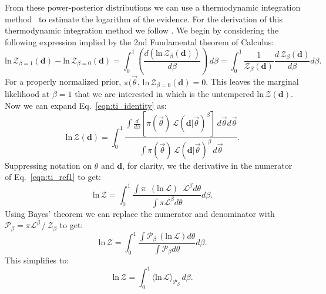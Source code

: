From these power-posterior distributions we can use a thermodynamic integration method~\citep{lartillot2006computing,friel2008marginal} to estimate the logarithm of the evidence. For the derivation of this thermodynamic integration method we follow \citep{annis2019thermodynamic}.
We begin by considering the following expression implied by the 2nd Fundamental theorem of Calculus:
\begin{equation}\label{eqn:ti_identity}
    \mathrm{ln} \, \mathcal{Z}_{\beta=1}\left(\mathbf{d}\right) - \mathrm{ln} \, \mathcal{Z}_{\beta=0}\left(\mathbf{d}\right) = \int^1_0 \left(\frac{d\left(\mathrm{ln} \, \mathcal{Z}_\beta \left(\mathbf{d}\right) \right)}{d\beta}\right) \, d\beta = \int^1_0 \frac{1}{\mathcal{Z}_\beta \left(\mathbf{d}\right)} \frac{d \, \mathcal{Z}_\beta \left(\mathbf{d}\right)}{d\beta} d\beta.
\end{equation}
For a properly normalized prior, $\pi(\vec{\theta}$, $\mathrm{ln} \, \mathcal{Z}_{\beta=0} \left(\mathbf{d}\right) = 0$. This leaves the marginal likelihood at $\beta=1$ that we are interested in which is the untempered $\mathrm{ln} \, \mathcal{Z} \left(\mathbf{d}\right)$. Now we can expand Eq.~\ref{eqn:ti_identity} as:
\begin{equation}
    \mathrm{ln} \, \mathcal{Z} \left(\mathbf{d}\right) = \int_0^1 \frac{\int \frac{d}{d\beta} \left[\pi\left(\vec{\theta}\right) \, \mathcal{L} \left(\mathbf{d}|\vec{\theta} \right)^\beta \right]\, d\vec{\theta} d\vec{\theta}}{\int \pi\left(\vec{\theta}\right) \, \mathcal{L}\left(\mathbf{d}|\vec{\theta} \right)^\beta \, d\vec{\theta}}.
\end{equation}\label{eqn:ti_ref1}
Suppressing notation on $\theta$ and $\mathbf{d}$, for clarity, we the derivative in the numerator of Eq.~\ref{eqn:ti_ref1} to get:
\begin{equation}
    \mathrm{ln} \, \mathcal{Z} = \int^1_0 \frac{\int \pi \, \, \, \left(\mathrm{ln} \, \mathcal{L}\right) \, \, \, \mathcal{L}^{\beta} d\theta}{\int \pi \mathcal{L}^{\beta} d\theta} d\beta.
\end{equation}
Using Bayes' theorem we can replace the numerator and denominator with $\mathcal{P}_\beta = \pi \mathcal{L}^\beta \, / \, \mathcal{Z}_\beta$ to get:
\begin{equation}
    \mathrm{ln} \, \mathcal{Z} = \int^1_0 \frac{\int \mathcal{P}_\beta \, \left(\mathrm{ln} \, \mathcal{L}\right) d\theta}{\int \mathcal{P}_\beta   d\theta} d\beta.
\end{equation}
This simplifies to:
\begin{equation}
   \mathrm{ln} \, \mathcal{Z} = \int^1_0 \langle \mathrm{ln} \, \mathcal{L} \rangle_{\mathcal{P}_\beta} \, d\beta.
\end{equation}\label{eq:thermoint}
